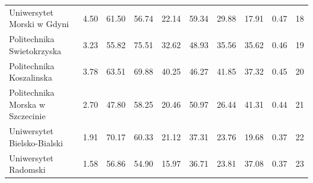\begin{table}[htbp]
\begin{tabular}{lrrrrrrrrr}
Uniwersytet Morski w Gdyni & 4.50 & 61.50 & 56.74 & 22.14 & 59.34 & 29.88 & 17.91 & 0.47 & 18 \\
Politechnika Swietokrzyska & 3.23 & 55.82 & 75.51 & 32.62 & 48.93 & 35.56 & 35.62 & 0.46 & 19 \\
Politechnika Koszalinska & 3.78 & 63.51 & 69.88 & 40.25 & 46.27 & 41.85 & 37.32 & 0.45 & 20 \\
Politechnika Morska w Szczecinie & 2.70 & 47.80 & 58.25 & 20.46 & 50.97 & 26.44 & 41.31 & 0.44 & 21 \\
Uniwersytet Bielsko-Bialski & 1.91 & 70.17 & 60.33 & 21.12 & 37.31 & 23.76 & 19.68 & 0.37 & 22 \\
Uniwersytet Radomski & 1.58 & 56.86 & 54.90 & 15.97 & 36.71 & 23.81 & 37.08 & 0.37 & 23 \\
\bottomrule
\end{tabular}
\end{table}
